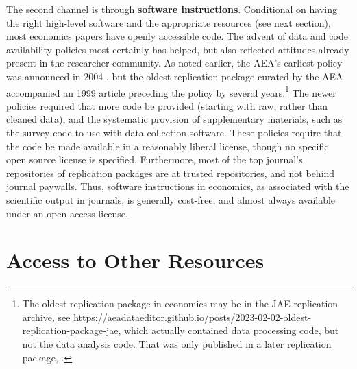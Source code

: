 \documentclass{Revue-economique}
\newcommand{\citep}{\parencite}
\newcommand{\citet}{\textcite}
\begin{document}
\begin{Article} [%
	Titre={Reproducibility and Open Science in Economics},
	Auteur={Lars Vilhuber\thanks{Cornell University, lars.vilhuber@cornell.edu}}]
\begin{refsection}[Main]
The second channel is through  \textbf{software instructions}. Conditional on having the right high-level software and the appropriate resources (see next section), most economics papers have openly accessible code. The advent of data and code availability policies most certainly has helped, but also reflected attitudes already present in the researcher community. As noted earlier, the AEA's earliest policy was announced in 2004 \citep{bernanke_editorial_2004}, but the oldest replication package curated by the AEA accompanied an 1999 article \citep{frankel_does_1999,frankel_replication_1999} preceding the policy by several years.\footnote{The oldest  replication package in economics may be \citet{koenker_asymptotic_1988-1} in the JAE replication archive, see \url{https://aeadataeditor.github.io/posts/2023-02-02-oldest-replication-package-jae}, which actually contained data processing code, but not the data analysis code. That was only published in a later replication package, \citet{koenker_reproducible_2009}.} The newer policies \citep{AEA-announcement-July-2019,koren_data_2022} required that more code be provided (starting with raw, rather than cleaned data), and the systematic provision of supplementary materials, such as the survey code to use with data collection software. These policies require that the code be made available in a reasonably liberal license, though no specific open source license is specified. Furthermore, most of the top journal's repositories of replication packages are at trusted repositories, and not behind journal paywalls. Thus, software instructions in economics, as associated with the scientific output in journals, is generally cost-free, and almost always available under an open access license. 



%


\section{Access to Other Resources}
\label{sec:other_resources}


\end{refsection}
\end{Article}
\end{document}
